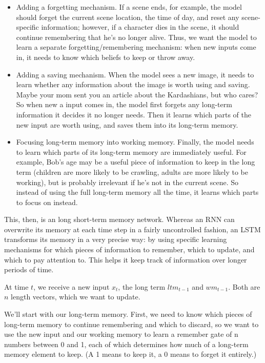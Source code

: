 \begin{itemize}
    \item Adding a forgetting mechanism. If a scene ends, for example, the model should
    forget the current scene location, the time of day, and reset any scene-specific
    information; however, if a character dies in the scene, it should continue
    remembering that he's no longer alive. Thus, we want the model to learn a
    separate forgetting/remembering mechanism: when new inputs come in, it needs to
    know which beliefs to keep or throw away.
    \item Adding a saving mechanism. When the
    model sees a new image, it needs to learn whether any information about the
    image is worth using and saving. Maybe your mom sent you an article about the
    Kardashians, but who cares? So when new a input comes in, the model first
    forgets any long-term information it decides it no longer needs. Then it learns
    which parts of the new input are worth using, and saves them into its long-term
    memory.
    \item Focusing long-term memory into working memory. Finally, the model needs
    to learn which parts of its long-term memory are immediately useful. For
    example, Bob's age may be a useful piece of information to keep in the long term
    (children are more likely to be crawling, adults are more likely to be working),
    but is probably irrelevant if he's not in the current scene. So instead of using
    the full long-term memory all the time, it learns which parts to focus on
    instead.
\end{itemize}

This, then, is an long short-term memory network. Whereas an RNN can overwrite
its memory at each time step in a fairly uncontrolled fashion, an LSTM
transforms its memory in a very precise way: by using specific learning
mechanisms for which pieces of information to remember, which to update, and
which to pay attention to. This helps it keep track of information over longer
periods of time.

At time \(t\), we receive a new input \(x_t\), the long term \(ltm_{t-1}\) and
\(wm_{t - 1}\). Both are \(n\) length vectors, which we want to update.

We'll start with our long-term memory. First, we need to know which pieces of
long-term memory to continue remembering and which to discard, so we want to use
the new input and our working memory to learn a remember gate of n numbers
between 0 and 1, each of which determines how much of a long-term memory element
to keep. (A 1 means to keep it, a 0 means to forget it entirely.)


